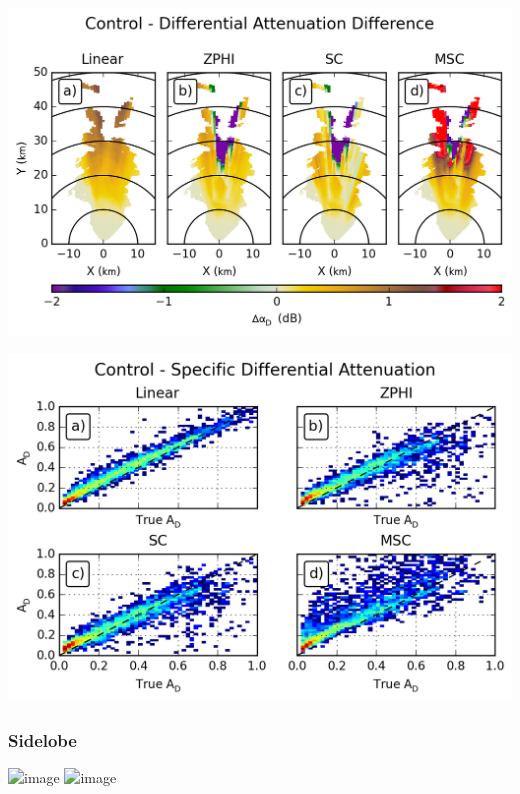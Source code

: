 \documentclass[red]{beamer}
\begin{document}
\begin{frame}
    \begin{center}
        \includegraphics[scale=0.7]{figures/spatial/X_Control_Differential_Attenuation_Difference}
    \end{center}
\end{frame}

\begin{frame}
    \begin{center}
        \includegraphics[scale=0.7]{figures/spatial/X_Control_Specific_Differential_Attenuation_scatter}
    \end{center}
\end{frame}

\subsubsection{Sidelobe}
\begin{frame}
    \begin{center}
        \includegraphics<1>[scale=0.7]{figures/spatial/C_Sidelobe_Attenuation_H}
        \includegraphics<2>[scale=0.7]{figures/spatial/C_Control_Attenuation_H}
    \end{center}
\end{frame}
\end{document}
